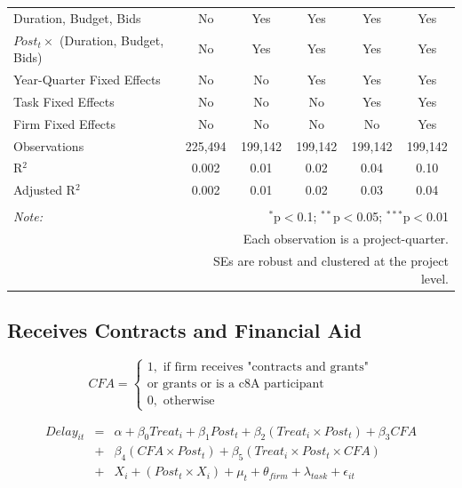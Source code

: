 \documentclass[]{article}
\begin{document}
\begin{table}[H]
\begin{tabular}{@{\extracolsep{-2pt}}lccccc}
Duration, Budget, Bids & No & Yes & Yes & Yes & Yes \\ 
$Post_t \times $  (Duration, Budget, Bids) & No & Yes & Yes & Yes & Yes \\ 
Year-Quarter Fixed Effects & No & No & Yes & Yes & Yes \\ 
Task Fixed Effects & No & No & No & Yes & Yes \\ 
Firm Fixed Effects & No & No & No & No & Yes \\ 
Observations & 225,494 & 199,142 & 199,142 & 199,142 & 199,142 \\ 
R$^{2}$ & 0.002 & 0.01 & 0.02 & 0.04 & 0.10 \\ 
Adjusted R$^{2}$ & 0.002 & 0.01 & 0.02 & 0.03 & 0.04 \\ 
\hline 
\hline \\[-1.8ex] 
\textit{Note:}  & \multicolumn{5}{r}{$^{*}$p$<$0.1; $^{**}$p$<$0.05; $^{***}$p$<$0.01} \\ 
 & \multicolumn{5}{r}{Each observation is a project-quarter.} \\ 
 & \multicolumn{5}{r}{SEs are robust and clustered at the project level.} \\ 
\end{tabular} 
\end{table}

\hypertarget{receives-contracts-and-financial-aid}{%
\subsection{Receives Contracts and Financial
Aid}\label{receives-contracts-and-financial-aid}}

\[ CFA = \begin{cases} 1, \text{ if firm receives "contracts and grants"}\\ 
                       \text{or grants or is a c8A participant}\\
0, \text{ otherwise} \end{cases}\]

\[ \begin{aligned}
Delay_{it} &=& \alpha+\beta_0 Treat_i + \beta_1 Post_t + \beta_2 (Treat_i \times Post_t) +\beta_3 CFA \\
&+& \beta_4 (CFA \times Post_t) + \beta_5 (Treat_i \times Post_t \times CFA) \\ 
&+&X_i + (Post_t \times X_i) + \mu_t + \theta_{firm} + \lambda_{task}+ \epsilon_{it}
\end{aligned}\]
\end{document}
